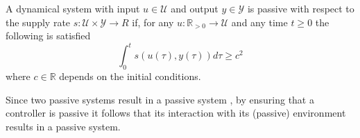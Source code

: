 \begin{definition}
  A dynamical system with input $ u \in \mathcal{U}$ and output $y \in \mathcal{Y}$ is passive with respect to the supply rate $s : \mathcal{U} \times \mathcal{Y} \rightarrow{R}$ if, for any $u: \mathbb{R}_{>0} \rightarrow \mathcal{U}$ and any time $t \geq 0$ the following is satisfied
  \begin{equation}
    \int_0^t s \left( u(\tau),  y (\tau) \right) d \tau \geq c^2
  \end{equation}
  where $c \in \mathbb{R}$ depends on the initial conditions.
\end{definition}

Since two passive systems result in a passive system \cite{sepulchre2012constructive}, by ensuring that a controller is passive it follows that its interaction with its (passive) environment results in a passive system.
